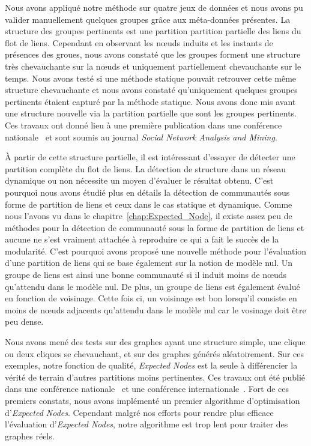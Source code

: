 Nous avons appliqué notre méthode sur quatre jeux de données et nous avons pu valider manuellement quelques groupes grâce aux méta-données présentes.
La structure des groupes pertinents est une partition partition partielle des liens du flot de liens.
Cependant en observant les n\oe uds induits et les instants de présences des groues, nous avons constaté que les groupes forment une structure très chevauchante sur la n\oe uds et uniquement partiellement chevauchante sur le temps.
Nous avons testé si une méthode statique pouvait retrouver cette même structure chevauchante et nous avons constaté qu'uniquement quelques groupes pertinents étaient capturé par la méthode statique.
Nous avons donc mis avant une structure nouvelle via la partition partielle que sont les groupes pertinents.
Ces travaux ont donné lieu à une première publication dans une conférence nationale~\cite{Gaumont2016} et sont soumis au journal \emph{Social Network Analysis and Mining}.


\bigskip

\`A partir de cette structure partielle, il est intéressant d'essayer de détecter une partition complète du flot de liens.
La détection de structure dans un réseau dynamique ou non nécessite un moyen d'évaluer le résultat obtenu.
C'est pourquoi nous avons étudié plus en détails la détection de communautés sous forme de partition de liens et ceux dans le cas statique et dynamique.
Comme nous l'avons vu dans le chapitre~\ref{chap:Expected_Node}, il existe assez peu de méthodes pour la détection de communauté sous la forme de partition de liens et aucune ne s'est vraiment attachée à reproduire ce qui a fait le succès de la modularité.
C'est pourquoi avons proposé une nouvelle méthode pour l'évaluation d'une partition de liens qui se base également sur la notion de modèle nul.
Un groupe de liens est ainsi une bonne communauté si il induit moins de n\oe uds qu'attendu dans le modèle nul.
De plus, un groupe de liens est également évalué en fonction de voisinage.
Cette fois ci, un voisinage est bon lorsqu'il consiste en moins de n\oe uds adjacents qu'attendu dans le modèle nul car le vosinage doit être peu dense.

Nous avons mené des tests sur des graphes ayant une structure simple, une clique ou deux cliques se chevauchant, et sur des graphes générés aléatoirement.
Sur ces exemples, notre fonction de qualité, \emph{Expected Nodes} est la seule à différencier la vérité de terrain d'autres partitions moins pertinentes.
Ces travaux ont été publié dans une conférence nationale~\cite{Gaumont2014} et une conférence internationale~\cite{Gaumont2015}.
Fort de ces premiers constats, nous avons implémenté un premier algorithme d'optimisation d'\emph{Expected Nodes}.
Cependant malgré nos efforts pour rendre plus efficace l'évaluation d'\emph{Expected Nodes}, notre algorithme est trop lent pour traiter des graphes réels.

